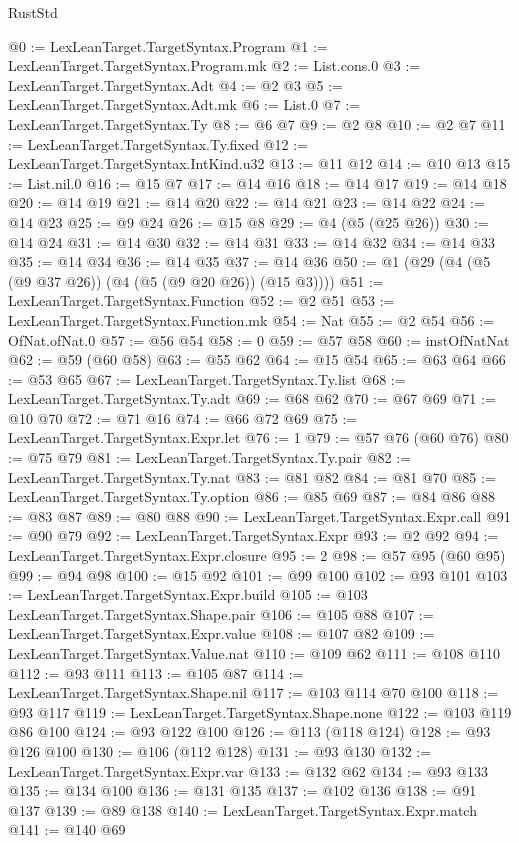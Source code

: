 \begin{lexlean}{RustStd}
\begin{coremodule}
@0 := LexLeanTarget.TargetSyntax.Program
@1 := LexLeanTarget.TargetSyntax.Program.mk
@2 := List.cons.{0}
@3 := LexLeanTarget.TargetSyntax.Adt
@4 := @2 @3
@5 := LexLeanTarget.TargetSyntax.Adt.mk
@6 := List.{0}
@7 := LexLeanTarget.TargetSyntax.Ty
@8 := @6 @7
@9 := @2 @8
@10 := @2 @7
@11 := LexLeanTarget.TargetSyntax.Ty.fixed
@12 := LexLeanTarget.TargetSyntax.IntKind.u32
@13 := @11 @12
@14 := @10 @13
@15 := List.nil.{0}
@16 := @15 @7
@17 := @14 @16
@18 := @14 @17
@19 := @14 @18
@20 := @14 @19
@21 := @14 @20
@22 := @14 @21
@23 := @14 @22
@24 := @14 @23
@25 := @9 @24
@26 := @15 @8
@29 := @4 (@5 (@25 @26))
@30 := @14 @24
@31 := @14 @30
@32 := @14 @31
@33 := @14 @32
@34 := @14 @33
@35 := @14 @34
@36 := @14 @35
@37 := @14 @36
@50 := @1 (@29 (@4 (@5 (@9 @37 @26)) (@4 (@5 (@9 @20 @26)) (@15 @3))))
@51 := LexLeanTarget.TargetSyntax.Function
@52 := @2 @51
@53 := LexLeanTarget.TargetSyntax.Function.mk
@54 := Nat
@55 := @2 @54
@56 := OfNat.ofNat.{0}
@57 := @56 @54
@58 := 0
@59 := @57 @58
@60 := instOfNatNat
@62 := @59 (@60 @58)
@63 := @55 @62
@64 := @15 @54
@65 := @63 @64
@66 := @53 @65
@67 := LexLeanTarget.TargetSyntax.Ty.list
@68 := LexLeanTarget.TargetSyntax.Ty.adt
@69 := @68 @62
@70 := @67 @69
@71 := @10 @70
@72 := @71 @16
@74 := @66 @72 @69
@75 := LexLeanTarget.TargetSyntax.Expr.let
@76 := 1
@79 := @57 @76 (@60 @76)
@80 := @75 @79
@81 := LexLeanTarget.TargetSyntax.Ty.pair
@82 := LexLeanTarget.TargetSyntax.Ty.nat
@83 := @81 @82
@84 := @81 @70
@85 := LexLeanTarget.TargetSyntax.Ty.option
@86 := @85 @69
@87 := @84 @86
@88 := @83 @87
@89 := @80 @88
@90 := LexLeanTarget.TargetSyntax.Expr.call
@91 := @90 @79
@92 := LexLeanTarget.TargetSyntax.Expr
@93 := @2 @92
@94 := LexLeanTarget.TargetSyntax.Expr.closure
@95 := 2
@98 := @57 @95 (@60 @95)
@99 := @94 @98
@100 := @15 @92
@101 := @99 @100
@102 := @93 @101
@103 := LexLeanTarget.TargetSyntax.Expr.build
@105 := @103 LexLeanTarget.TargetSyntax.Shape.pair
@106 := @105 @88
@107 := LexLeanTarget.TargetSyntax.Expr.value
@108 := @107 @82
@109 := LexLeanTarget.TargetSyntax.Value.nat
@110 := @109 @62
@111 := @108 @110
@112 := @93 @111
@113 := @105 @87
@114 := LexLeanTarget.TargetSyntax.Shape.nil
@117 := @103 @114 @70 @100
@118 := @93 @117
@119 := LexLeanTarget.TargetSyntax.Shape.none
@122 := @103 @119 @86 @100
@124 := @93 @122 @100
@126 := @113 (@118 @124)
@128 := @93 @126 @100
@130 := @106 (@112 @128)
@131 := @93 @130
@132 := LexLeanTarget.TargetSyntax.Expr.var
@133 := @132 @62
@134 := @93 @133
@135 := @134 @100
@136 := @131 @135
@137 := @102 @136
@138 := @91 @137
@139 := @89 @138
@140 := LexLeanTarget.TargetSyntax.Expr.match
@141 := @140 @69

\end{coremodule}
\end{lexlean}
